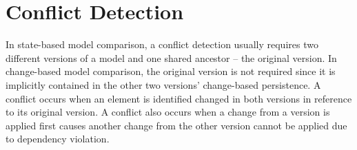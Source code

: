
\section{Conflict Detection}
\label{sec:conflict_detection}
In state-based model comparison, a conflict detection usually requires two different versions of a model and one shared ancestor -- the original version. In change-based model comparison, the original version is not required since it is implicitly contained in the other two versions' change-based persistence. A conflict occurs when an element is identified changed in both versions in reference to its original version. A conflict also occurs when a change from a version is applied first causes another change from the other version cannot be applied due to dependency violation. 

